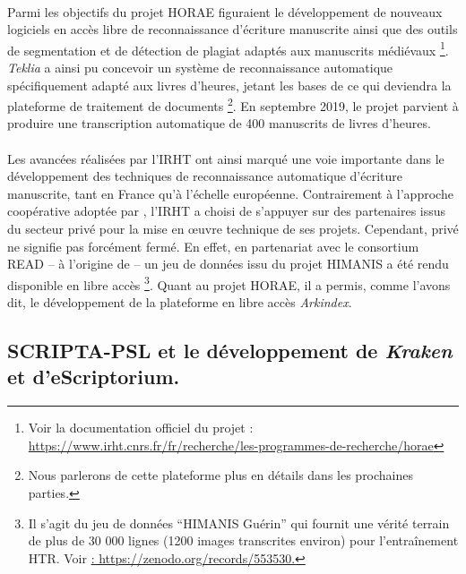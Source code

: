 \documentclass[a4paper,12pt,twoside]{book}
\begin{document}
\paragraph{}
Parmi les objectifs du projet HORAE figuraient le développement de nouveaux logiciels en accès libre de reconnaissance d’écriture manuscrite ainsi que des outils de segmentation et de détection de plagiat adaptés aux manuscrits médiévaux \footnote{ Voir la documentation officiel du projet : \url{https://www.irht.cnrs.fr/fr/recherche/les-programmes-de-recherche/horae}}. \textit{Teklia} a ainsi pu concevoir un système de reconnaissance automatique spécifiquement adapté aux livres d’heures, jetant les bases de ce qui deviendra la plateforme de traitement de documents \footnote{Nous parlerons de cette plateforme plus en détails dans les prochaines parties.}. En septembre 2019, le projet parvient à produire une transcription automatique de 400 manuscrits de livres d'heures. 

\paragraph{}
Les avancées réalisées par l’IRHT ont ainsi marqué une voie importante dans le développement des techniques de reconnaissance automatique d’écriture manuscrite, tant en France qu’à l’échelle européenne. Contrairement à l’approche coopérative adoptée par , l’IRHT a choisi de s’appuyer sur des partenaires issus du secteur privé pour la mise en œuvre technique de ses projets. Cependant, privé ne signifie pas forcément fermé. En effet, en partenariat avec le consortium READ – à l’origine de  – un jeu de données issu du projet HIMANIS a été rendu disponible en libre accès \footnote{Il s'agit du jeu de données \enquote{HIMANIS Guérin} qui fournit une vérité terrain de plus de 30 000 lignes (1200 images transcrites environ) pour l'entraînement HTR. Voir \url{: https://zenodo.org/records/553530.}}. Quant au projet HORAE, il a permis, comme l'avons dit, le développement de la plateforme en libre accès \textit{Arkindex}.

\subsection{SCRIPTA-PSL et le développement de \textit{Kraken} et d'eScriptorium.}
\end{document}
